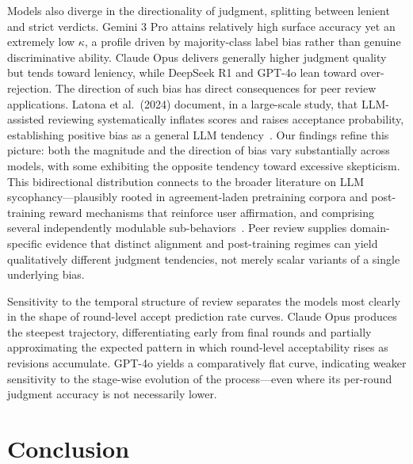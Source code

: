 \documentclass[preprint,10pt,times]{elsarticle}
\begin{document}
Models also diverge in the directionality of judgment, splitting between lenient and strict verdicts. Gemini 3 Pro attains relatively high surface accuracy yet an extremely low $\kappa$, a profile driven by majority-class label bias rather than genuine discriminative ability. Claude Opus delivers generally higher judgment quality but tends toward leniency, while DeepSeek R1 and GPT-4o lean toward over-rejection. The direction of such bias has direct consequences for peer review applications. Latona et al.\ (2024) document, in a large-scale study, that LLM-assisted reviewing systematically inflates scores and raises acceptance probability, establishing positive bias as a general LLM tendency~\cite{ref46}. Our findings refine this picture: both the magnitude and the direction of bias vary substantially across models, with some exhibiting the opposite tendency toward excessive skepticism. This bidirectional distribution connects to the broader literature on LLM sycophancy---plausibly rooted in agreement-laden pretraining corpora and post-training reward mechanisms that reinforce user affirmation, and comprising several independently modulable sub-behaviors~\cite{ref47,ref48}. Peer review supplies domain-specific evidence that distinct alignment and post-training regimes can yield qualitatively different judgment tendencies, not merely scalar variants of a single underlying bias.

Sensitivity to the temporal structure of review separates the models most clearly in the shape of round-level accept prediction rate curves. Claude Opus produces the steepest trajectory, differentiating early from final rounds and partially approximating the expected pattern in which round-level acceptability rises as revisions accumulate. GPT-4o yields a comparatively flat curve, indicating weaker sensitivity to the stage-wise evolution of the process---even where its per-round judgment accuracy is not necessarily lower.

\section{Conclusion}
\label{sec:conclusion}
\end{document}
